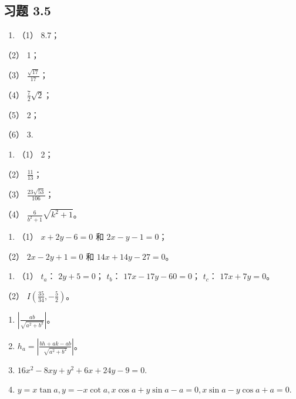 \subsection{习题 3.5}\label{ux4e60ux9898-3.5}

\begin{enumerate}
\def\labelenumi{\arabic{enumi}.}
\tightlist
\item
  （1） 8.7；
\end{enumerate}

（2） 1；

（3） \(\frac{\sqrt{17}}{17}\)；

（4） \(\frac{7}{2}\sqrt{2}\)；

（5） 2；

（6） 3.

\begin{enumerate}
\def\labelenumi{\arabic{enumi}.}
\setcounter{enumi}{1}
\tightlist
\item
  （1） 2；
\end{enumerate}

（2） \(\frac{11}{13}\)；

（3） \(\frac{23\sqrt{53}}{106}\)；

（4） \(\frac{6}{b^2 + 1}\sqrt{k^2 + 1}\)。

\begin{enumerate}
\def\labelenumi{\arabic{enumi}.}
\setcounter{enumi}{2}
\tightlist
\item
  （1） \(x + 2y - 6 = 0\) 和 \(2x - y - 1 = 0\)；
\end{enumerate}

（2） \(2x - 2y + 1 = 0\) 和 \(14x + 14y - 27 = 0\)。

\begin{enumerate}
\def\labelenumi{\arabic{enumi}.}
\setcounter{enumi}{3}
\tightlist
\item
  （1） \(t_{a}\)： \(2y + 5 = 0\)； \(t_{b}\)：
  \(17x - 17y - 60 = 0\)； \(t_{c}\)： \(17x + 7y = 0\)。
\end{enumerate}

（2） \(I\left(\frac{35}{34}, -\frac{5}{2}\right)\)。

\begin{enumerate}
\def\labelenumi{\arabic{enumi}.}
\setcounter{enumi}{5}
\item
  \(\left|\frac{ab}{\sqrt{a^2 + b^2}}\right|\)。
\item
  \(h_{a} = \left|\frac{bh + ak - ab}{\sqrt{a^{2} + b^{2}}}\right|\)。
\item
  \(16x^{2} - 8xy + y^{2} + 6x + 24y - 9 = 0.\)
\item
  \(y = x\tan a, y = -x\cot a, x\cos a + y\sin a - a = 0, x\sin a - y\cos a + a = 0.\)
\end{enumerate}

